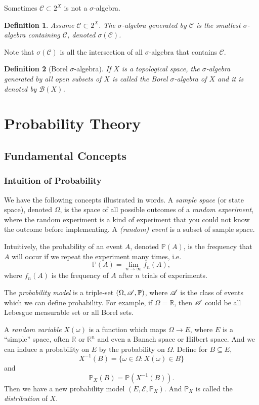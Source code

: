 \documentclass[12pt,a4paper]{report}
\numberwithin{equation}{section}
\theoremstyle{mystyle}
\newtheorem{definition}{Definition}[section]
\newcommand{\R}{\mathbb{R}}
\begin{document}
	Sometimes $\mathscr{C}\subset 2^X$ is not a $\sigma$-algebra.
	\begin{definition}
		Assume $\mathscr{C}\subset 2^X$. The $\sigma$-algebra generated by $\mathscr{C}$ is the smallest $\sigma$-algebra containing $\mathscr{C}$, denoted $\sigma(\mathscr{C})$.
	\end{definition}
	Note that $\sigma(\mathscr{C})$ is all the intersection of all $\sigma$-algebra that contains $\mathscr{C}$.
	
	\begin{definition}[Borel $\sigma$-algebra]
		If $X$ is a topological space, the $\sigma$-algebra generated by all open subsets of $X$ is called the Borel $\sigma$-algebra of $X$ and it is denoted by $\mathscr{B}(X)$.
	\end{definition}
	
	
	
	\renewcommand{\Pr}{\mathbb{P}}
	\part{Probability Theory}
	\chapter{Fundamental Concepts}
	\section{Intuition of Probability}
	We have the following concepts illustrated in words. A \emph{sample space} (or state space), denoted $\Omega$, is the space of all possible outcomes of a \emph{random experiment}, where the random experiment is a kind of experiment that you could not know the outcome before implementing. A \emph{(random) event} is a subset of sample space.
	
	Intuitively, the probability of an event $A$, denoted $\Pr(A)$, is the frequency that $A$ will occur if we repeat the experiment many times, i.e.
	\begin{equation}
		\Pr(A)=\lim_{n\to\infty} f_n(A),
	\end{equation}
	where $f_n(A)$ is the frequency of $A$ after $n$ trials of experiments.
	
	The \emph{probability model} is a triple-set $(\Omega,\A,\Pr)$, where $\mathscr{A}$ is the class of events which we can define probability. For example, if $\Omega=\R$, then $\mathscr{A}$ could be all Lebesgue measurable set or all Borel sets.
	
	A \emph{random variable} $X(\omega)$ is a function which maps $\Omega\to E$, where $E$ is a ``simple'' space, often $\R$ or $\R^n$ and even a Banach space or Hilbert space. And we can induce a probability on $E$ by the probability on $\Omega$. Define for $B\subseteq E$, 
	\begin{equation*}
		X^{-1}(B)=\{\omega\in \Omega:X(\omega)\in B\}
	\end{equation*}
	and
	\begin{equation}
		\Pr_X(B)=\Pr(X^{-1}(B)).
	\end{equation}
	Then we have a new probability model $(E,\mathscr{E},\Pr_X)$. And $\Pr_X$ is called the \emph{distribution} of $X$.
\end{document}
